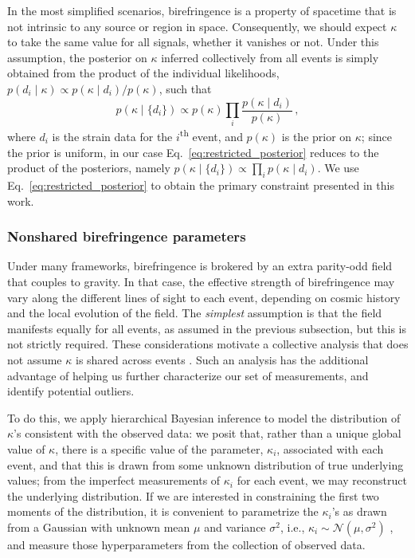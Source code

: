 \documentclass[aps,prd,twocolumn,superscriptaddress,preprintnumbers,floatfix,nofootinbib]{revtex4-2}
\begin{document}
In the most simplified scenarios, birefringence is a property of spacetime that is not intrinsic to any source or region in space. 
Consequently, we should expect $\kappa$ to take the same value for all signals, whether it vanishes or not.
Under this assumption, the posterior on $\kappa$ inferred collectively from all events is simply obtained from the product of the individual likelihoods, $p(d_i \mid\kappa) \propto p(\kappa \mid d_i)/p(\kappa)$, such that
\begin{equation}
    p(\kappa \mid \{d_i\})\propto p(\kappa) \prod_{i}\frac{p(\kappa \mid d_i)}{p(\kappa)}\,,
    \label{eq:restricted_posterior}
\end{equation}
where $d_i$ is the strain data for the $i$\textsuperscript{th} event, and $p(\kappa)$ is the prior on $\kappa$; since the prior is uniform, in our case Eq.~\eqref{eq:restricted_posterior} reduces to the product of the posteriors, namely $p(\kappa \mid \{d_i\}) \propto \prod_{i}p(\kappa \mid d_i)$.
We use Eq.~\eqref{eq:restricted_posterior} to obtain the primary constraint presented in this work.

\subsubsection{Nonshared birefringence parameters}
\label{sec:method:hier}

Under many frameworks, birefringence is brokered by an extra parity-odd field that couples to gravity.
In that case, the effective strength of birefringence may vary along the different lines of sight to each event, depending on cosmic history and the local evolution of the field.
The \emph{simplest} assumption is that the field manifests equally for all events, as assumed in the previous subsection, but this is not strictly required.
These considerations motivate a collective analysis that does not assume $\kappa$ is shared across events \cite{Zimmerman:2019wzo,Isi:2022cii}.
Such an analysis has the additional advantage of helping us further characterize our set of measurements, and identify potential outliers.

To do this, we apply hierarchical Bayesian inference \cite{Loredo:2004nn} to model the distribution of $\kappa$'s consistent with the observed data:
we posit that, rather than a unique global value of $\kappa$, there is a specific value of the parameter, $\kappa_i$, associated with each event, and that this is drawn from some unknown distribution of true underlying values; from the imperfect measurements of $\kappa_i$ for each event, we may reconstruct the underlying distribution.
If we are interested in constraining the first two moments of the distribution, it is convenient to parametrize the $\kappa_i$'s as drawn from a Gaussian with unknown mean $\mu$ and variance $\sigma^2$, i.e., $\kappa_i \sim \mathcal{N}(\mu, \sigma^2)$ \cite{Isi:2019asy}, and measure those hyperparameters from the collection of observed data.
\end{document}
